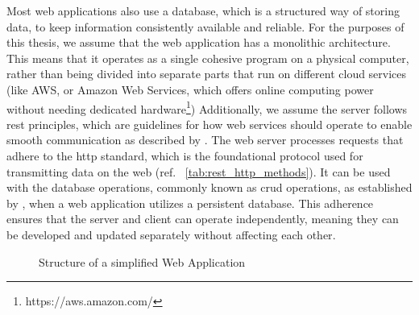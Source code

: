 Most web applications also use a database, which is a structured way of storing data, to keep information consistently available and reliable. For the purposes of this thesis, we assume that the web application has a monolithic architecture. This means that it operates as a single cohesive program on a physical computer, rather than being divided into separate parts that run on different cloud services (like AWS, or Amazon Web Services, which offers online computing power without needing dedicated hardware\footnote{https://aws.amazon.com/})
Additionally, we assume the server follows \gls{rest} principles, which are guidelines for how web services should operate to enable smooth communication as described by \citet{roy_t_fielding_rest_2008}. 
The web server processes requests that adhere to the \gls{http} standard, which is the foundational protocol used for transmitting data on the web (ref. ~\autoref{tab:rest_http_methods}). It can be used  with the database operations, commonly known as \gls{crud} operations, as established by \citet{martin_managing_1983}, when a web application utilizes a persistent database.
This adherence ensures that the server and client can operate independently, meaning they can be developed and updated separately without affecting each other\cite{fielding_http_2022}.


\begin{figure}[ht]
    \centering
    \caption{Structure of a simplified Web Application}
    \label{fig:simplified-web-app}

\end{figure}

